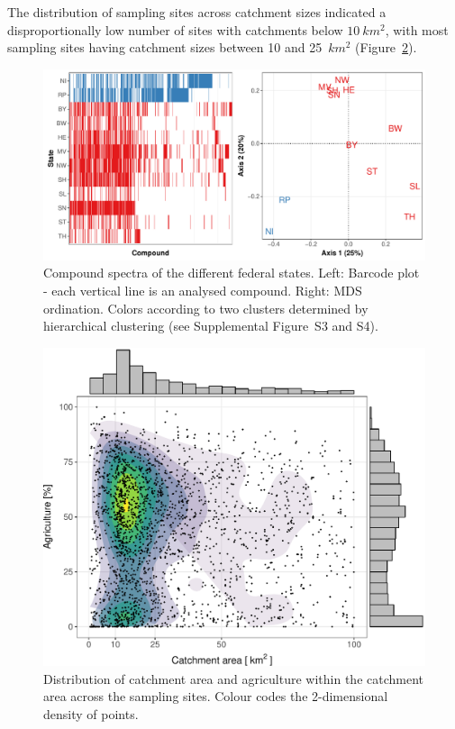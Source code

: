 The distribution of sampling sites across catchment sizes indicated a disproportionally low number of sites with catchments below $10~km^2$, with
most sampling sites having catchment sizes between 10 and 25~$km^2$ (Figure~\ref{fig:ss:fig3}). 

\clearpage

\begin{landscape}
\begin{figure}[ht]
  \centering
  \vspace{1cm}
  \includegraphics[width=0.8\textheight]{chapters/smallstreams/figure2.pdf}
  \caption[Compound spectra of the different federal states.]{Compound spectra of the different federal states. Left: Barcode plot - each vertical line is an analysed compound. Right: MDS ordination. 
  Colors according to two clusters determined by hierarchical clustering (see Supplemental Figure~S3 and S4).}
  \label{fig:ss:fig2}
\end{figure}
\end{landscape}


\begin{figure}[ht]
  \includegraphics[width=\textwidth]{chapters/smallstreams/figure3.pdf}
  \caption[Distribution of catchment area and agriculture within the catchment area across the sampling sites.]{Distribution of catchment area and agriculture within the catchment area across the sampling sites.
  Colour codes the 2-dimensional density of points.}
  \label{fig:ss:fig3}
\end{figure}


